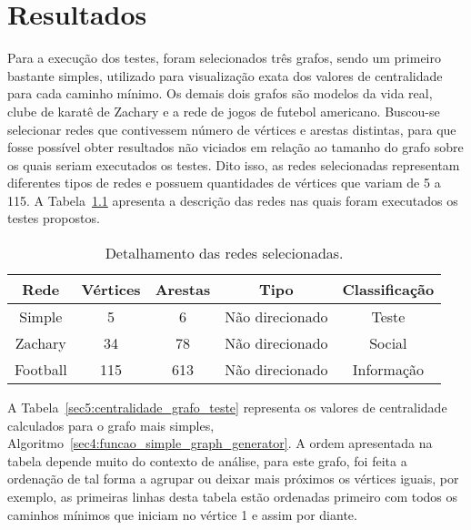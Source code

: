 \graphicspath{{\currfiledir/images/}}

\chapter{Resultados}
Para a execução dos testes, foram selecionados três grafos, sendo um primeiro bastante simples, utilizado para visualização exata dos valores de centralidade para cada caminho mínimo. Os demais dois grafos são modelos da vida real, clube de karatê de Zachary e a rede de jogos de futebol americano. Buscou-se selecionar redes que contivessem número de vértices e arestas distintas, para que fosse possível obter resultados não viciados em relação ao tamanho do grafo sobre os quais seriam executados os testes. Dito isso, as redes selecionadas representam diferentes tipos de redes e possuem quantidades de vértices que variam de 5 a 115. A Tabela~\ref{sec5:tab_grafos_teste} apresenta a descrição das redes nas quais foram executados os testes propostos.

\begin{table}[!htp]
	\centering
	\caption{Detalhamento das redes selecionadas.}
	\label{sec5:tab_grafos_teste}
	\begin{tabular}{|c|c|c|c|c|}
		\hline
		\textbf{Rede} & \textbf{Vértices} & \textbf{Arestas} & \textbf{Tipo}   & \textbf{Classificação} \\ \hline
		Simple        & 5                 & 6                & Não direcionado & Teste                  \\
		Zachary       & 34                & 78               & Não direcionado & Social                 \\
		Football      & 115               & 613              & Não direcionado & Informação             \\ \hline
	\end{tabular}
\end{table}

A Tabela~\ref{sec5:centralidade_grafo_teste} representa os valores de centralidade calculados para o grafo mais simples, Algoritmo~\ref{sec4:funcao_simple_graph_generator}. A ordem apresentada na tabela depende muito do contexto de análise, para este grafo, foi feita a ordenação de tal forma a agrupar ou deixar mais próximos os vértices iguais, por exemplo, as primeiras linhas desta tabela estão ordenadas primeiro com todos os caminhos mínimos que iniciam no vértice 1 e assim por diante.


